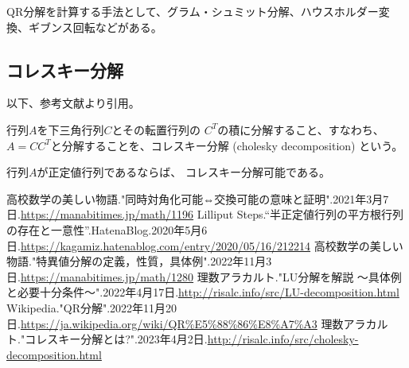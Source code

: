\documentclass[a4paper, 10pt, dvipdfmx]{jlreq}
\begin{document}
QR分解を計算する手法として、グラム・シュミット分解、ハウスホルダー変換、ギブンス回転などがある。

\subsection*{コレスキー分解}

以下、参考文献\cite{site:6}より引用。

行列$A$を下三角行列$C$とその転置行列の $C^T$の積に分解すること、すなわち、$A=CC^T$と分解することを、コレスキー分解 (cholesky decomposition) という。

行列$A$が正定値行列であるならば、 コレスキー分解可能である。

\begin{thebibliography}{9}
  高校数学の美しい物語."同時対角化可能⇔交換可能の意味と証明".2021年3月7日.\url{https://manabitimes.jp/math/1196}
  Lilliput Steps.“半正定値行列の平方根行列の存在と一意性”.HatenaBlog.2020年5月6日.\url{https://kagamiz.hatenablog.com/entry/2020/05/16/212214}
  高校数学の美しい物語."特異値分解の定義，性質，具体例".2022年11月3日.\url{https://manabitimes.jp/math/1280}
  理数アラカルト."LU分解を解説 ～具体例と必要十分条件～".2022年4月17日.\url{http://risalc.info/src/LU-decomposition.html}
  Wikipedia."QR分解".2022年11月20日.\url{https://ja.wikipedia.org/wiki/QR%E5%88%86%E8%A7%A3}
  理数アラカルト."コレスキー分解とは?".2023年4月2日.\url{http://risalc.info/src/cholesky-decomposition.html}
\end{thebibliography}
\end{document}
